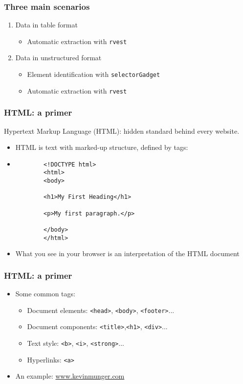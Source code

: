 \documentclass{beamer}
\begin{document}
\begin{frame}
	\frametitle{Three main scenarios}
	
	\begin{enumerate}[<+->]
		
		\item Data in \alert{table} format
		\begin{itemize}
			\item Automatic extraction with \texttt{rvest}
		\end{itemize}
		\vspace{.25cm}
		\item Data in \alert{unstructured} format
		\begin{itemize}
			\item Element identification with \texttt{selectorGadget}
			\item Automatic extraction with \texttt{rvest}
		\end{itemize}
		\vspace{.25cm}
	
		
	\end{enumerate}
	
\end{frame}

\begin{frame}[fragile]
	\frametitle{HTML: a primer}
	Hypertext Markup Language (HTML): hidden standard behind every website. \pause
	\begin{itemize}
		\item HTML is text with marked-up structure, defined by \alert{tags}:
		\item\begin{verbatim}
		<!DOCTYPE html>
		<html>
		<body>
		
		<h1>My First Heading</h1>
		
		<p>My first paragraph.</p>
		
		</body>
		</html>
		\end{verbatim}
		\item What you see in your browser is an interpretation of the HTML document
	\end{itemize}
	
\end{frame}

\begin{frame}[fragile]
	\frametitle{HTML: a primer}
	\begin{itemize}[<+->]
		\item Some common tags:
		\begin{itemize}
			\item Document elements: \verb|<head>|, \verb|<body>|, \verb|<footer>|...
			\item Document components: \verb|<title>|,\verb|<h1>|, \verb|<div>|...
			\item Text style: \verb|<b>|, \verb|<i>|, \verb|<strong>|...
			\item Hyperlinks: \verb|<a>|
		\end{itemize}
		\item  An example: \href{http://www.kevinmunger.com}{www.kevinmunger.com}
	\end{itemize}
\end{frame}
\end{document}
